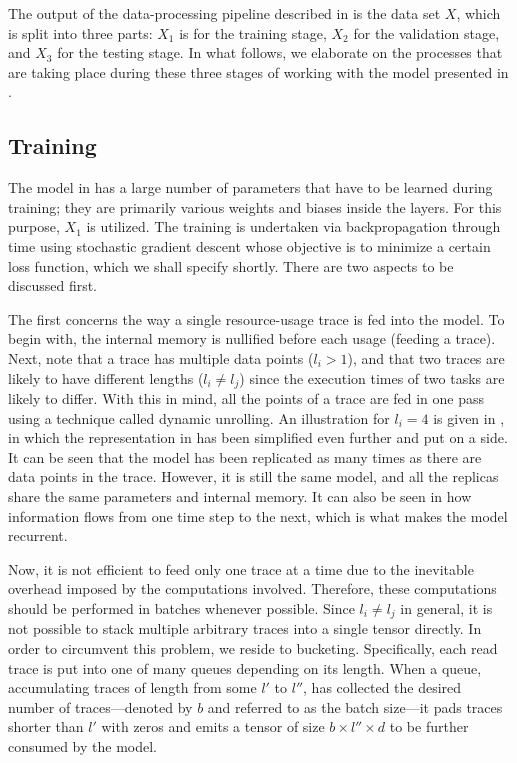 The output of the data-processing pipeline described in  is the data
set $X$, which is split into three parts: $X_1$ is for the training stage, $X_2$
for the validation stage, and $X_3$ for the testing stage. In what follows, we
elaborate on the processes that are taking place during these three stages of
working with the model presented in .

\subsection{Training} 
The model in  has a large number of parameters that have to be
learned during training; they are primarily various weights and biases inside
the layers. For this purpose, $X_1$ is utilized. The training is undertaken via
backpropagation through time using stochastic gradient descent
\cite{goodfellow2016} whose objective is to minimize a certain loss function,
which we shall specify shortly. There are two aspects to be discussed first.


The first concerns the way a single resource-usage trace is fed into the model.
To begin with, the internal memory is nullified before each usage (feeding a
trace). Next, note that a trace has multiple data points ($l_i > 1$), and that
two traces are likely to have different lengths ($l_i \neq l_j$) since the
execution times of two tasks are likely to differ. With this in mind, all the
points of a trace are fed in one pass using a technique called dynamic
unrolling. An illustration for $l_i = 4$ is given in , in which the
representation in  has been simplified even further and put on a
side. It can be seen that the model has been replicated as many times as there
are data points in the trace. However, it is still the same model, and all the
replicas share the same parameters and internal memory. It can also be seen in
 how information flows from one time step to the next, which is
what makes the model recurrent.

Now, it is not efficient to feed only one trace at a time due to the inevitable
overhead imposed by the computations involved. Therefore, these computations
should be performed in batches whenever possible. Since $l_i \neq l_j$ in
general, it is not possible to stack multiple arbitrary traces into a single
tensor directly. In order to circumvent this problem, we reside to bucketing.
Specifically, each read trace is put into one of many queues depending on its
length. When a queue, accumulating traces of length from some $l'$ to $l''$, has
collected the desired number of traces---denoted by $b$ and referred to as the
batch size---it pads traces shorter than $l'$ with zeros and emits a tensor of
size $b \times l'' \times d$ to be further consumed by the model.


